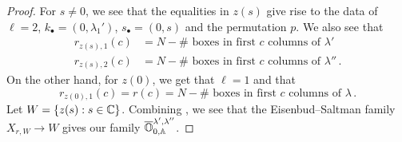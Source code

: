 \documentclass{article} %
\begin{document}
\begin{proof}
For $ s \ne 0$, we see that the equalities in $ z(s) $ give rise to the data of 
\(\ell =2\), \(k_\bullet = (0,\lambda_1')\), \(s_\bullet = (0,s)\) and the permutation $p$.
We also see that
\begin{equation} 
\label{eq:rcols}
    \begin{split}
            r_{z(s), 1}(c) &=  N - \#\text{~boxes in first $c$ columns of }\lambda' \\
            r_{z(s), 2}(c) &=  N - \#\text{~boxes in first $c$ columns of }\lambda'' \,. 
    \end{split}
\end{equation}
On the other hand, for $z(0)$, we get that $ \ell = 1$ and that 
\begin{equation} 
\label{eq:rcol2}
    r_{z(0),1}(c) = 
    r(c) = N - \#\text{~boxes in first $c$ columns of }\lambda\,. 
\end{equation}
% 
% 
% 
Let $ W = \{ z(s) : s \in \mathbb C \}$. Combining ,
we see that the Eisenbud--Saltman family $ X_{r, W} \rightarrow W $ gives our family $ \overline{\mathbb O}^{\lambda', \lambda''}_{0, \mathbb A}$.
\end{proof}
% 
% 
\end{document}
